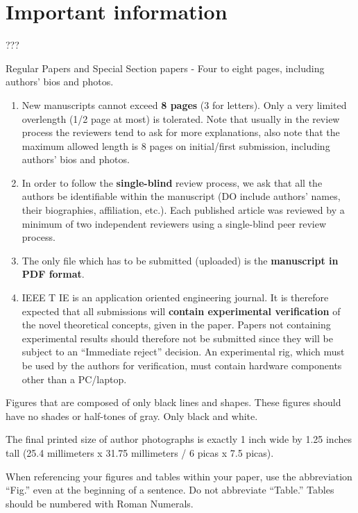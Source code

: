 \documentclass[journal]{IEEEtranTIE}
\theoremstyle{definition}
\begin{document}
\section{Important information}

 ???

Regular Papers and Special Section papers - Four to eight pages, including authors' bios and photos.

\begin{enumerate}[1)]
	\item New manuscripts cannot exceed \textbf{8 pages} (3 for letters). Only a very limited overlength (1/2 page at most) is tolerated. Note that usually in the review process the reviewers tend to ask for more explanations, also note that the maximum allowed length is 8 pages on initial/first submission, including authors' bios and photos.
	\item In order to follow the \textbf{single-blind} review process, we ask that all the authors be identifiable within the manuscript (DO include authors' names, their biographies, affiliation, etc.). Each published article was reviewed by a minimum of two independent reviewers using a single-blind peer review process.
	\item The only file which has to be submitted (uploaded) is the \textbf{manuscript in PDF format}.
	\item IEEE T IE is an application oriented engineering journal. It is therefore expected that all submissions will \textbf{contain experimental verification} of the novel theoretical concepts, given in the paper. Papers not containing experimental results should therefore not be submitted since they will be subject to an ``Immediate reject'' decision. An experimental rig, which must be used by the authors for verification, must contain hardware components other than a PC/laptop.	
\end{enumerate}

Figures that are composed of only black lines and shapes. These figures should have no shades or half-tones of gray. Only black and white.

The final printed size of author photographs is exactly
1 inch wide by 1.25 inches tall (25.4 millimeters x 31.75 millimeters / 6 picas x 7.5 picas).

When referencing your figures and tables within your paper, use the abbreviation ``Fig.'' even at the beginning of a sentence. Do not abbreviate ``Table.'' Tables should be numbered with Roman Numerals.
\end{document}
